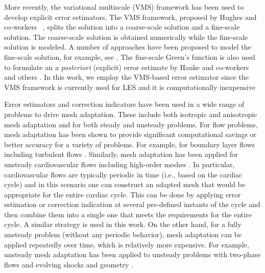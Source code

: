 More recently, the variational multiscale (VMS) framework has been used to develop explicit error estimators. 
The VMS framework, proposed by Hughes and co-workers ~\cite{hughes1995multiscale,hughes1998variational}, splits the solution into a coarse-scale solution and a fine-scale solution. 
The coarse-scale solution is obtained numerically while the fine-scale solution is modeled. 
A number of approaches have been proposed to model the fine-scale solution, for example, see \cite{brezzi1997b,brezzi1992relationship,brezzi1994choosing,codina2002stabilized,hughes2007variational,principe2010stabilization}. 
The fine-scale Green's function is also used to formulate an \textit{a posteriori} (explicit) error estimate by Hauke and co-workers \cite{hauke2006proper,hauke2006multiscale,hauke2008variational,hauke2012mesh,hauke2014recent,hauke2015variational,irisarri2016posteriori} and others \cite{bayona2018variational}.
In this work, we employ the VMS-based error estimator
since the VMS framework is currently used for LES and it is computationally inexpensive

Error estimators and correction indicators have been used in a wide range of problems to drive mesh adaptation. These include both isotropic and anisotropic mesh adaptation and for both steady and unsteady problems. For flow problems, mesh adaptation has been shown to provide significant computational savings or better accuracy for a variety of problems. For example, for boundary layer flows \cite{bib:Sahni2008,bib:Sahni2017_adapt} including turbulent flows \cite{bib:Chitale2015}. Similarly, mesh adaptation has been applied for unsteady cardiovascular flows \cite{bib:Muller2005,bib:Sahni2006,bib:Sahni2009} including high-order meshes \cite{bib:Sahni2010}. In particular, cardiovascular flows are typically periodic in time (i.e., based on the cardiac cycle) and in this scenario one can construct an adapted mesh that would be appropriate for the entire cardiac cycle. This can be done by applying error estimation or correction indication at several pre-defined instants of the cycle and then combine them into a single one that meets the requirements for the entire cycle. A similar strategy is used in this work. On the other hand, for a fully unsteady problem (without any periodic behavior), mesh adaptation can be applied repeatedly over time, which is relatively more expensive. For example, unsteady mesh adaptation has been applied to unsteady problems with two-phase flows \cite{bib:rodriguez2013} and evolving shocks and geometry \cite{bib:Yang2021}.


